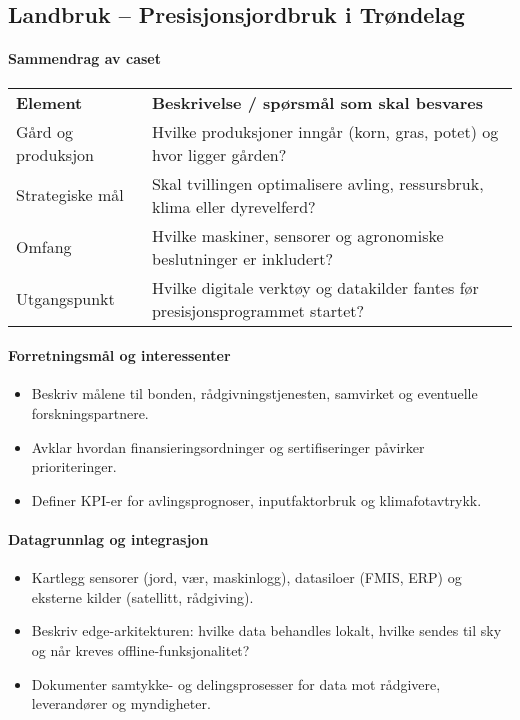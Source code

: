 \subsection{Landbruk – Presisjonsjordbruk i Trøndelag}
\paragraph{Sammendrag av caset}
\begin{tabular}{p{}p{}}
\textbf{Element} & \textbf{Beskrivelse / spørsmål som skal besvares} \\
Gård og produksjon & Hvilke produksjoner inngår (korn, gras, potet) og hvor ligger gården? \\
Strategiske mål & Skal tvillingen optimalisere avling, ressursbruk, klima eller dyrevelferd? \\
Omfang & Hvilke maskiner, sensorer og agronomiske beslutninger er inkludert? \\
Utgangspunkt & Hvilke digitale verktøy og datakilder fantes før presisjonsprogrammet startet? \\
\end{tabular}

\paragraph{Forretningsmål og interessenter}
\begin{itemize}
    \item Beskriv målene til bonden, rådgivningstjenesten, samvirket og eventuelle forskningspartnere.\citep{landbruksdir2023digitalisering}
    \item Avklar hvordan finansieringsordninger og sertifiseringer påvirker prioriteringer.
    \item Definer KPI-er for avlingsprognoser, inputfaktorbruk og klimafotavtrykk.
\end{itemize}

\paragraph{Datagrunnlag og integrasjon}
\begin{itemize}
    \item Kartlegg sensorer (jord, vær, maskinlogg), datasiloer (FMIS, ERP) og eksterne kilder (satellitt, rådgiving).\citep{nibio2023dataflyt}
    \item Beskriv edge-arkitekturen: hvilke data behandles lokalt, hvilke sendes til sky og når kreves offline-funksjonalitet?\citep{etsi2023mec}
    \item Dokumenter samtykke- og delingsprosesser for data mot rådgivere, leverandører og myndigheter.
\end{itemize}

